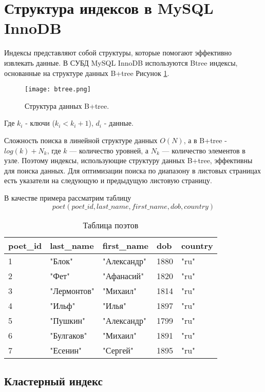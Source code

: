 \section{Структура индексов в MySQL InnoDB}

Индексы представляют собой структуры, которые помогают эффективно извлекать данные.
В СУБД MySQL InnoDB используются Btree индексы, основанные на структуре данных B+tree Рисунок \ref{img:btree-structure}.

\begin{figure}[H]
  \centering
  \texttt{[image: btree.png]}
  \caption{Структура данных B+tree.}
  \label{img:btree-structure}
\end{figure}

Где
$k_i$ - ключи ($k_i < k_i + 1$),
$d_i$ - данные.

Сложность поиска в линейной структуре данных $O(N)$, а в B+tree - $log(k)+N_k$, где $k$ — количество уровней, а $N_k$ — количество элементов в узле. Поэтому индексы, использующие структуру данных B+tree, эффективны для поиска данных. Для оптимизации поиска по диапазону в листовых страницах есть указатели на следующую и предыдущую листовую страницу.

В качестве примера рассматрим таблицу $$poet (poet\_id, last\_name, first\_name, dob, country)$$

\begin{table}[h]
\caption{Таблица поэтов}
\medskip
\begin{tabular}{|l|l|l|l|l|}
\hline
poet\_id & last\_name & first\_name & dob & country\\
\hline
1 & "Блок" & "Александр" & 1880 & "ru"\\
2 & "Фет" & "Афанасий" & 1820 & "ru"\\
3 & "Лермонтов" & "Михаил" & 1814 & "ru"\\
4 & "Ильф" & "Илья" & 1897 & "ru"\\
5 & "Пушкин" & "Александр" & 1799 & "ru"\\
6 & "Булгаков" & "Михаил" & 1891 & "ru"\\
7 & "Есенин" & "Сергей" & 1895 & "ru"\\
\hline
\end{tabular}
\end{table}

\subsection{Кластерный индекс}

